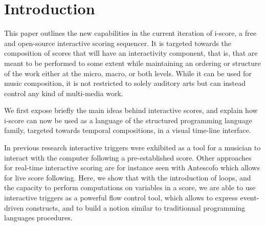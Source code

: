 \documentclass{article}
\title{\papertitle}
\begin{document}
%
\capstartfalse
\maketitle
\capstarttrue
%
\begin{abstract}
     The development and authoring of interactive music or applications, such as user interfaces for arts \& exhibitions
     has traditionally been done with tools that pertain to two broad metaphors. 
     Cue-based environments work by making groups of parameters and sending them to remote devices, 
     while more interactive applications are generally written in generic art-oriented 
     programming environments, such as Max/MSP, Processing or OpenFrameworks.
     In this paper, we argue about the specific issues that arise in such environments, and we present 
     the current version of the i-score sequencer. It is an extensive software suite that bridges
     the gap between time-based, logic-based and flow-based interactive application authoring tools. 
     This is done in a single cohesive graphical user interface, built upon a few simple and novel primitives that give to the composer the expressive power of structured programming, in a time line adapted to the notation of parameter-oriented interactive music.    
\end{abstract}
%

\section{Introduction}\label{sec:introduction}
This paper outlines the new capabilities in the current iteration of i-score, 
a free and open-source interactive scoring sequencer.
It is targeted towards the composition of scores that will have 
an interactivity component, that is, that are meant to be performed 
to some extent while maintaining an ordering or structure of the work either at the micro, macro, or both levels.
While it can be used for music composition, it is not restricted to solely auditory arts
but can instead control any kind of multi-media work.

We first expose briefly the main ideas behind interactive scores, and explain 
how i-score can now be used as a language of the structured programming language 
family, targeted towards temporal compositions, in a visual time-line interface.

In previous research\cite{hogue2014ossia,allombert2006concurrent} interactive triggers 
were exhibited as a tool for a musician to interact with the computer following a pre-established score.
Other approaches for real-time interactive scoring are for instance seen with Antescofo%
 which allows for live score following.
Here, we show that with the introduction of loops, and the capacity to perform computations 
on variables in a score, we are able to use interactive triggers as a powerful flow control tool, which 
allows to express event-driven constructs, and to build a notion similar to traditionnal programming 
languages procedures.
\end{document}
